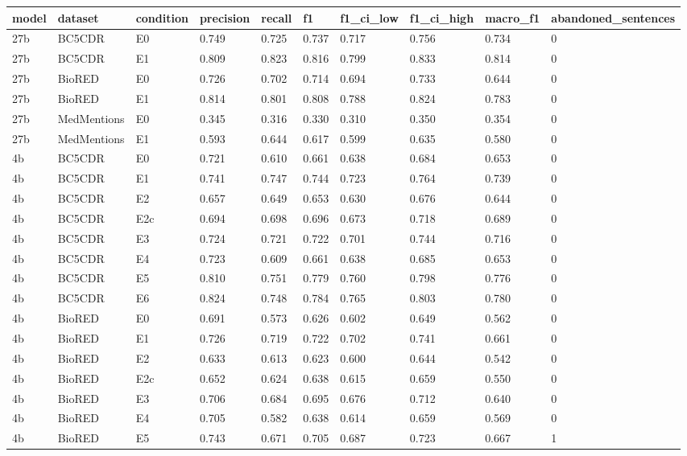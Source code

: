 \begin{table}[t]
\centering
\small
\begin{tabular}{llllllllll}
\hline
model & dataset & condition & precision & recall & f1 & f1\_ci\_low & f1\_ci\_high & macro\_f1 & abandoned\_sentences \\
\hline
27b & BC5CDR & E0 & 0.749 & 0.725 & 0.737 & 0.717 & 0.756 & 0.734 & 0 \\
27b & BC5CDR & E1 & 0.809 & 0.823 & 0.816 & 0.799 & 0.833 & 0.814 & 0 \\
27b & BioRED & E0 & 0.726 & 0.702 & 0.714 & 0.694 & 0.733 & 0.644 & 0 \\
27b & BioRED & E1 & 0.814 & 0.801 & 0.808 & 0.788 & 0.824 & 0.783 & 0 \\
27b & MedMentions & E0 & 0.345 & 0.316 & 0.330 & 0.310 & 0.350 & 0.354 & 0 \\
27b & MedMentions & E1 & 0.593 & 0.644 & 0.617 & 0.599 & 0.635 & 0.580 & 0 \\
4b & BC5CDR & E0 & 0.721 & 0.610 & 0.661 & 0.638 & 0.684 & 0.653 & 0 \\
4b & BC5CDR & E1 & 0.741 & 0.747 & 0.744 & 0.723 & 0.764 & 0.739 & 0 \\
4b & BC5CDR & E2 & 0.657 & 0.649 & 0.653 & 0.630 & 0.676 & 0.644 & 0 \\
4b & BC5CDR & E2c & 0.694 & 0.698 & 0.696 & 0.673 & 0.718 & 0.689 & 0 \\
4b & BC5CDR & E3 & 0.724 & 0.721 & 0.722 & 0.701 & 0.744 & 0.716 & 0 \\
4b & BC5CDR & E4 & 0.723 & 0.609 & 0.661 & 0.638 & 0.685 & 0.653 & 0 \\
4b & BC5CDR & E5 & 0.810 & 0.751 & 0.779 & 0.760 & 0.798 & 0.776 & 0 \\
4b & BC5CDR & E6 & 0.824 & 0.748 & 0.784 & 0.765 & 0.803 & 0.780 & 0 \\
4b & BioRED & E0 & 0.691 & 0.573 & 0.626 & 0.602 & 0.649 & 0.562 & 0 \\
4b & BioRED & E1 & 0.726 & 0.719 & 0.722 & 0.702 & 0.741 & 0.661 & 0 \\
4b & BioRED & E2 & 0.633 & 0.613 & 0.623 & 0.600 & 0.644 & 0.542 & 0 \\
4b & BioRED & E2c & 0.652 & 0.624 & 0.638 & 0.615 & 0.659 & 0.550 & 0 \\
4b & BioRED & E3 & 0.706 & 0.684 & 0.695 & 0.676 & 0.712 & 0.640 & 0 \\
4b & BioRED & E4 & 0.705 & 0.582 & 0.638 & 0.614 & 0.659 & 0.569 & 0 \\
4b & BioRED & E5 & 0.743 & 0.671 & 0.705 & 0.687 & 0.723 & 0.667 & 1 \\

\end{tabular}
\end{table}
